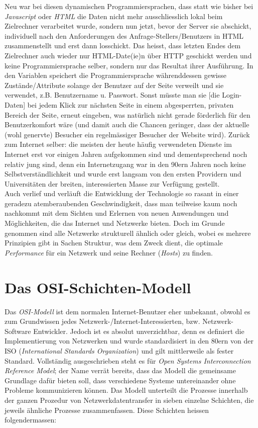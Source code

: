 \documentclass[b5paper,10pt,dvips,fleqn,titlepage,twoside]{book}
\begin{document}
Neu war bei diesen dynamischen Programmiersprachen, dass statt wie bisher bei \emph{Javascript} oder \emph{HTML} die Daten nicht mehr ausschliesslich lokal beim Zielrechner verarbeitet wurde, sondern nun jetzt, bevor der Server sie abschickt, individuell nach den Anforderungen des Anfrage-Stellers/Benutzers in HTML zusammenstellt und erst dann losschickt. Das heisst, dass letzten Endes dem Zielrechner auch wieder nur HTML-Date(ie)n über HTTP geschickt werden und keine Programmiersprache selber, sondern nur das Resultat ihrer Ausführung. In den Variablen speichert die Programmiersprache währenddessen gewisse Zustände/Attribute solange der Benutzer auf der Seite verweilt und sie verwendet, z.B. Benutzername u. Passwort. Sonst müsste man sie [die Login-Daten] bei jedem Klick zur nächsten Seite in einem abgesperrten, privaten Bereich der Seite, erneut eingeben, was natürlich nicht gerade förderlich für den Benutzerkomfort wäre (und damit auch die Chancen geringer, dass der aktuelle (wohl genervte) Besucher ein regelmässiger Besucher der Website wird).\newline
Zurück zum Internet selber: die meisten der heute häufig verwendeten Dienste im Internet erst vor einigen Jahren aufgekommen sind und dementsprechend noch relativ jung sind, denn ein Internetzugang war in den 90ern Jahren noch keine Selbstverständlichkeit und wurde erst langsam von den ersten Providern und Universitäten der breiten, interessierten Masse zur Verfügung gestellt.\\
Auch verlief und verläuft die Entwicklung der Technologie so rasant in einer geradezu atemberaubenden Geschwindigkeit, dass man teilweise kaum noch nachkommt mit dem Sichten und Erlernen von neuen Anwendungen und Möglichkeiten, die das Internet und Netzwerke bieten. Doch im Grunde genommen sind alle Netzwerke strukturell ähnlich oder gleich, wobei es mehrere Prinzipien gibt in Sachen Struktur, was dem Zweck dient, die optimale \emph{Performance} für ein Netzwerk und seine Rechner (\textit{Hosts}) zu finden.\\
\chapter{Das OSI-Schichten-Modell}
Das \emph{OSI-Modell} ist dem normalen Internet-Benutzer eher unbekannt, obwohl es zum Grundwissen jedes Netzwerk-/Internet-Interessierten, bzw. Netzwerk-Software Entwickler. Jedoch ist es absolut unverzichtbar, denn es definiert die Implementierung von Netzwerken und wurde standardisiert in den 80ern von der ISO (\emph{International Standards Organization}) und gilt mittlerweile als fester Standard.
Vollständig ausgeschrieben steht es für \emph{Open Systems Interconnection Reference Model}; der Name verrät bereits, dass das Modell die gemeinsame Grundlage dafür bieten soll, dass verschiedene Systeme untereinander ohne Probleme kommunizieren können. Das Modell unterteilt die Prozesse innerhalb der ganzen Prozedur von Netzwerkdatentransfer in sieben einzelne Schichten, die jeweils ähnliche Prozesse zusammenfassen.
Diese Schichten heissen folgendermassen:\newline
\end{document}
